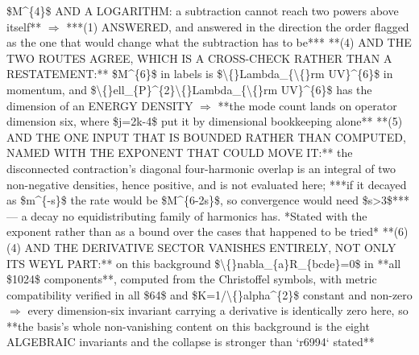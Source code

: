 \begin{description}
\$M\textasciicircum{}\{4\}\$ AND A LOGARITHM: a subtraction cannot reach two powers above itself** \ensuremath{\Rightarrow} ***(1) ANSWERED, and answered in the direction the order flagged as the one that would change what the subtraction has to be***  **(4) AND THE TWO ROUTES AGREE, WHICH IS A CROSS-CHECK RATHER THAN A RESTATEMENT:** \$M\textasciicircum{}\{6\}\$ in labels is \$\textbackslash\{\}Lambda\_\{\textbackslash\{\}rm UV\}\textasciicircum{}\{6\}\$ in momentum, and \$\textbackslash\{\}ell\_\{P\}\textasciicircum{}\{2\}\textbackslash\{\}Lambda\_\{\textbackslash\{\}rm UV\}\textasciicircum{}\{6\}\$ has the dimension of an ENERGY DENSITY \ensuremath{\Rightarrow} **the mode count lands on operator dimension six, where \$j=2k-4\$ put it by dimensional bookkeeping alone**  **(5)  AND THE ONE INPUT THAT IS BOUNDED RATHER THAN COMPUTED, NAMED WITH THE EXPONENT THAT COULD MOVE IT:** the disconnected contraction's diagonal four-harmonic overlap is an integral of two non-negative densities, hence positive, and is not evaluated here; ***if it decayed as \$m\textasciicircum{}\{-s\}\$ the rate would be \$M\textasciicircum{}\{6-2s\}\$, so convergence would need \$s>3\$*** --- a decay no equidistributing family of harmonics has. *Stated with the exponent rather than as a bound over the cases that happened to be tried*  **(6) (4) AND THE DERIVATIVE SECTOR VANISHES ENTIRELY, NOT ONLY ITS WEYL PART:** on this background \$\textbackslash\{\}nabla\_\{a\}R\_\{bcde\}=0\$ in **all \$1024\$ components**, computed from the Christoffel symbols, with metric compatibility verified in all \$64\$ and \$K=1/\textbackslash\{\}alpha\textasciicircum{}\{2\}\$ constant and non-zero \ensuremath{\Rightarrow} every dimension-six invariant carrying a derivative is identically zero here, so **the basis's whole non-vanishing content on this background is the eight ALGEBRAIC invariants and the collapse is stronger than `r6994` stated**

\end{description}
